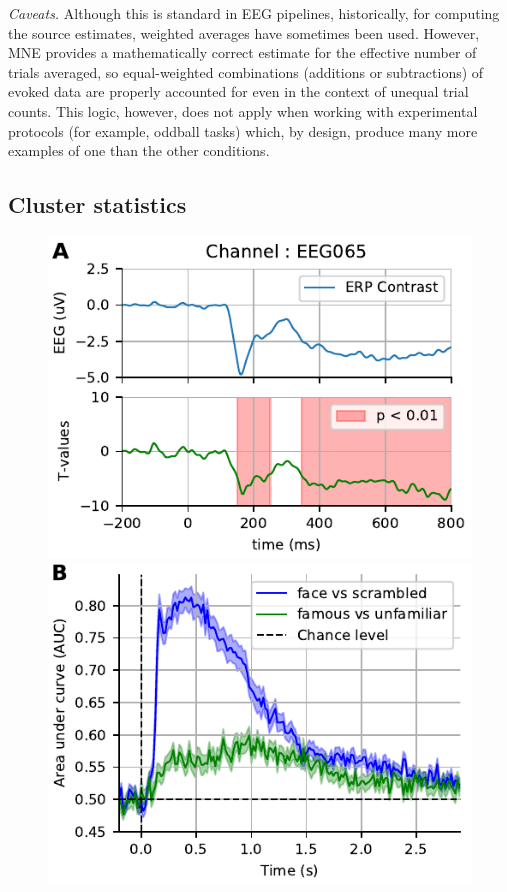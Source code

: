 \emph{Caveats.} Although this is standard in EEG pipelines, historically, for computing the source estimates, weighted averages have sometimes been used. However, MNE provides a mathematically correct estimate for the effective number of trials averaged, so equal-weighted combinations (additions or subtractions) of evoked data are properly accounted for even in the context of unequal trial counts. This logic, however, does not apply when working with experimental protocols (for example, oddball tasks) which, by design, produce many more examples of one than the other conditions.

\subsection{Cluster statistics}

\begin{figure}
\centering
    \includegraphics{figures/sensorstat_highpass-NoneHz.pdf}
    \includegraphics{figures/time_decoding_highpass-NoneHz.pdf}

\end{figure}
